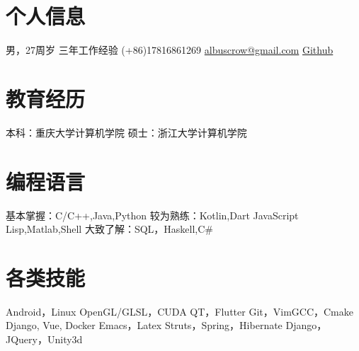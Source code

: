 \documentclass[]{friggeri-cv_cn} %
\begin{document}


\begin{aside} %
\section{个人信息}
男，27周岁
三年工作经验
(+86)17816861269
\href{mailto:albuscrow@gmail.com}{albuscrow@gmail.com}
\href{https://github.com/albuscrow}{Github}
\section{教育经历}
本科：重庆大学计算机学院
硕士：浙江大学计算机学院
\section{编程语言}
基本掌握：C/C++,Java,Python
较为熟练：Kotlin,Dart
  JavaScript
Lisp,Matlab,Shell
大致了解：SQL，Haskell,C\#
\section{各类技能}
\LARGE{Android}\normalsize{，}\LARGE{Linux}
\large{OpenGL/GLSL}\normalsize{，}\large{CUDA}
\LARGE{QT}\normalsize{，}\LARGE{Flutter}
\large{Git}\normalsize{，}\large{Vim}\normalsize{GCC，Cmake}
\normalsize{Django, Vue, Docker}
\normalsize{Emacs，Latex}
\small{Struts}\normalsize{，}\small{Spring}\normalsize{，}\small{Hibernate}
\small{Django}\normalsize{，}\small{JQuery}\normalsize{，}\small{Unity3d}
\end{aside}
\end{document}

